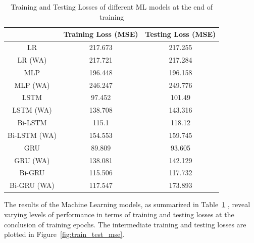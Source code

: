 \begin{table}[p]
    \renewcommand{\arraystretch}{1.5}
    \begin{center}
        \footnotesize
        \begin{tabular}{ |c|c|c| }
            \hline
            & Training Loss (MSE)        & Testing Loss (MSE)          \\
            \hline
            LR           & \cellcolor{red!10}217.673  & \cellcolor{red!10}217.255   \\
            \hline
            LR (WA)      & \cellcolor{red!20}217.721  & \cellcolor{red!20}217.284   \\
            \hline
            MLP          & 196.448                    & 196.158                     \\
            \hline
            MLP (WA)     & \cellcolor{red!30}246.247  & \cellcolor{red!30}249.776   \\
            \hline
            LSTM         & \cellcolor{green!20}97.452 & \cellcolor{green!20}101.49  \\
            \hline
            LSTM (WA)    & 138.708                    & 143.316                     \\
            \hline
            Bi-LSTM      & \cellcolor{green!10}115.1  & 118.12                      \\
            \hline
            Bi-LSTM (WA) & 154.553                    & 159.745                     \\
            \hline
            GRU          & \cellcolor{green!30}89.809 & \cellcolor{green!30}93.605  \\
            \hline
            GRU (WA)     & 138.081                    & 142.129                     \\
            \hline
            Bi-GRU       & 115.506                    & \cellcolor{green!10}117.732 \\
            \hline
            Bi-GRU (WA)  & 117.547                    & 173.893                     \\
            \hline
        \end{tabular}
    \end{center}
    \captionsetup{format=plain, justification=centering, font=small}
    \caption{Training and Testing Losses of different ML models at the end of training}
    \label{tab:train_test_mse}
\end{table}

The results of the Machine Learning models, as summarized in Table~\ref{tab:train_test_mse} , reveal varying levels of performance in terms of training and testing losses at the conclusion of training epochs.
The intermediate training and testing losses are plotted in Figure~\ref{fig:train_test_mse}.

